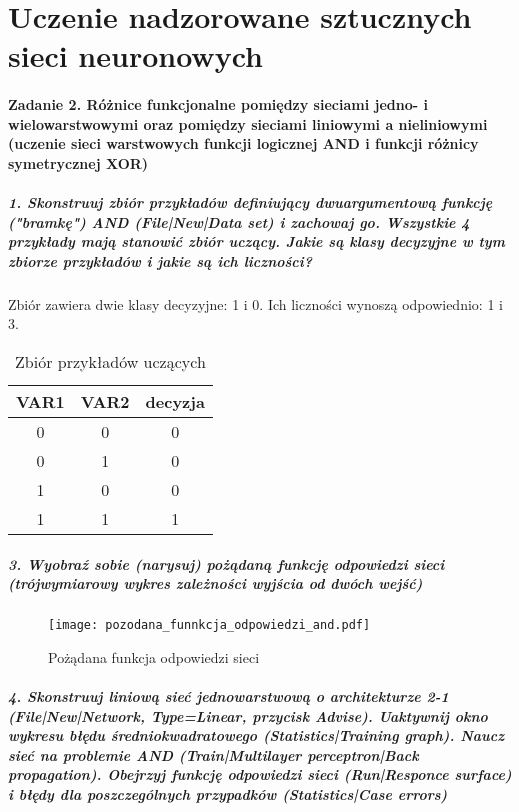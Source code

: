 \documentclass{article}
\begin{document}

\section{Uczenie nadzorowane sztucznych sieci neuronowych}

\paragraph{Zadanie 2. Różnice funkcjonalne pomiędzy sieciami jedno- i wielowarstwowymi oraz pomiędzy sieciami liniowymi a nieliniowymi (uczenie sieci warstwowych funkcji logicznej AND i funkcji różnicy symetrycznej XOR)}

\subparagraph{1. Skonstruuj zbiór przykładów definiujący dwuargumentową funkcję ("bramkę") AND (File|New|Data set) i zachowaj go. Wszystkie 4 przykłady mają stanowić zbiór uczący. Jakie są klasy decyzyjne w tym zbiorze przykładów i jakie są ich liczności?\\}

Zbiór zawiera dwie klasy decyzyjne: 1 i 0. Ich liczności wynoszą odpowiednio: 1 i 3. 

\begin{table}[h]
    \begin{tabular}{|c|c|c|}
     \hline
     	VAR1 & VAR2 & decyzja \\ \hline
        0 & 0 & 0 \\ 
        0 & 1 & 0 \\ 
		1 & 0 & 0 \\ 
		1 & 1 & 1 \\ \hline             
    \end{tabular}
    \caption{Zbiór przykładów uczących}
\end{table} 

\subparagraph{3. Wyobraź sobie (narysuj) pożądaną funkcję odpowiedzi sieci (trójwymiarowy wykres zależności wyjścia od dwóch wejść)\\}

\begin{figure}[H]
\begin{center}
\texttt{[image: pozodana\_funnkcja\_odpowiedzi\_and.pdf]}
\end{center}
\caption{Pożądana funkcja odpowiedzi sieci}
\label{fig-1Tdelta}
\end{figure}

\subparagraph{4. Skonstruuj liniową sieć jednowarstwową o architekturze 2-1 (File|New|Network, Type=Linear, przycisk Advise). Uaktywnij okno wykresu błędu średniokwadratowego (Statistics|Training graph). Naucz sieć na problemie AND (Train|Multilayer perceptron|Back propagation). Obejrzyj funkcję odpowiedzi sieci (Run|Responce surface) i błędy dla poszczególnych przypadków (Statistics|Case errors)\\}
\end{document}
